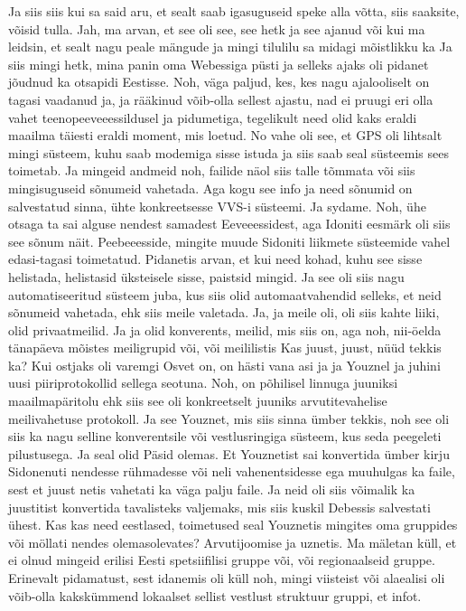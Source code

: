Ja siis siis kui sa said aru, et sealt saab igasuguseid speke alla võtta, siis saaksite, võisid tulla.
Jah, ma arvan, et see oli see, see hetk ja see ajanud või kui ma leidsin, et sealt nagu peale mängude ja mingi tilulilu sa midagi mõistlikku ka
Ja siis mingi hetk, mina panin oma Webessiga püsti ja selleks ajaks oli pidanet jõudnud ka otsapidi Eestisse. Noh, väga paljud, kes, kes nagu ajalooliselt on tagasi vaadanud ja, ja rääkinud võib-olla sellest ajastu, nad ei pruugi eri olla vahet teenopeeveeessildusel ja pidumetiga, tegelikult need olid kaks eraldi maailma täiesti eraldi moment, mis loetud. No vahe oli see, et GPS oli lihtsalt mingi süsteem, kuhu saab modemiga sisse istuda ja siis saab seal süsteemis sees toimetab. Ja mingeid andmeid noh, failide näol siis talle tõmmata või siis mingisuguseid sõnumeid vahetada. Aga kogu see info ja need sõnumid on salvestatud sinna, ühte konkreetsesse VVS-i süsteemi.
Ja sydame.
Noh, ühe otsaga ta sai alguse nendest samadest Eeveeessidest, aga Idoniti eesmärk oli siis see sõnum näit. Peebeeesside, mingite muude Sidoniti liikmete süsteemide vahel edasi-tagasi toimetatud.
Pidanetis arvan, et kui need kohad, kuhu see sisse helistada, helistasid üksteisele sisse, paistsid mingid.
Ja see oli siis nagu automatiseeritud süsteem juba, kus siis olid automaatvahendid selleks, et neid sõnumeid vahetada, ehk siis meile valetada. Ja, ja meile oli, oli siis kahte liiki, olid privaatmeilid.
Ja ja olid konverents, meilid, mis siis on, aga noh, nii-öelda tänapäeva mõistes meiligrupid või, või meililistis
Kas juust, juust, nüüd tekkis ka?
Kui ostjaks oli varemgi Osvet on, on hästi vana asi ja ja Youznel ja juhini uusi piiriprotokollid sellega seotuna.
Noh, on põhilisel linnuga juuniksi maailmapäritolu ehk siis see oli konkreetselt juuniks arvutitevahelise meilivahetuse protokoll. Ja see Youznet, mis siis sinna ümber tekkis, noh see oli siis ka nagu selline konverentsile või vestlusringiga süsteem, kus seda peegeleti pilustusega. Ja seal olid Päsid olemas. Et Youznetist sai konvertida ümber kirju Sidonenuti nendesse rühmadesse või neli vahenentsidesse ega muuhulgas ka faile, sest et juust netis vahetati ka väga palju faile. Ja neid oli siis võimalik ka juustitist konvertida tavalisteks valjemaks, mis siis kuskil Debessis salvestati ühest.
Kas kas need eestlased, toimetused seal Youznetis mingites oma gruppides või möllati nendes olemasolevates?
Arvutijoomise ja uznetis. Ma mäletan küll, et ei olnud mingeid erilisi Eesti spetsiifilisi gruppe või, või regionaalseid gruppe. Erinevalt pidamatust, sest idanemis oli küll noh, mingi viisteist või alaealisi oli võib-olla kakskümmend lokaalset sellist vestlust struktuur gruppi, et infot.
